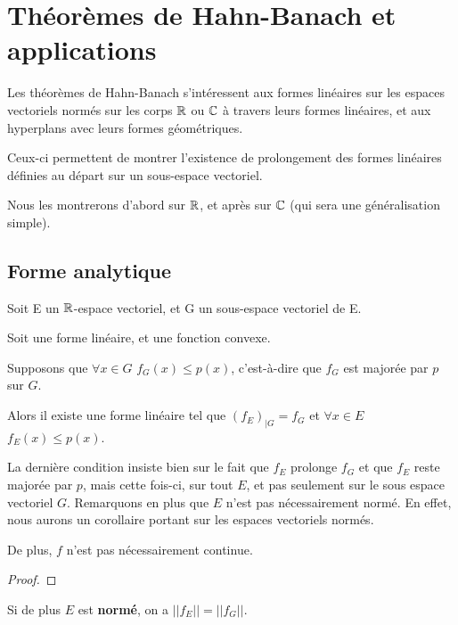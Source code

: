 \chapter{Théorèmes de Hahn-Banach et applications}

Les théorèmes de Hahn-Banach s'intéressent aux formes linéaires sur les espaces
vectoriels normés sur les corps $\mathbb{R}$ ou $\mathbb{C}$ à travers leurs formes
linéaires, et aux hyperplans avec leurs formes géométriques.

Ceux-ci permettent de montrer l'existence de prolongement des formes linéaires
définies au départ sur un sous-espace vectoriel.

Nous les montrerons d'abord sur $\mathbb{R}$, et après sur $\mathbb{C}$ (qui sera une
généralisation simple).

\section{Forme analytique}

\begin{theorem} 
\label{theorem_hahn_banach_analytic_1}
	Soit E un $\mathbb{R}$-espace vectoriel, et G un sous-espace vectoriel de E.

	Soit  une forme linéaire, et
	 une fonction convexe.

	Supposons que $\forall x \in G$ $f_{G}(x) \leq p(x)$, c'est-à-dire que
	$f_{G}$ est majorée par $p$ sur $G$.

	Alors il existe une forme linéaire  tel que
	${(f_{E})}_{|G} = f_{G}$ et $\forall x \in E$ $f_{E}(x) \leq p(x)$.
\end{theorem}

La dernière condition insiste bien sur le fait que $f_{E}$ prolonge $f_{G}$ et
que $f_{E}$ reste majorée par $p$, mais cette fois-ci, sur tout $E$, et pas
seulement sur le sous espace vectoriel $G$.
Remarquons en plus que $E$ n'est pas nécessairement normé. En effet, nous aurons
un corollaire portant sur les espaces vectoriels normés.

De plus, $f$ n'est pas nécessairement continue.

\begin{proof}
	
\end{proof}

\begin{corollary}
	Si de plus $E$ est \textbf{normé}, on a $||f_{E}|| = ||f_{G}||$.
\end{corollary}

